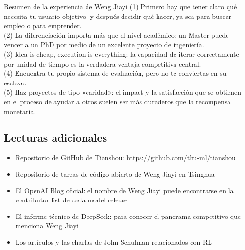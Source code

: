 \begin{importantbox}{Resumen de la experiencia de Weng Jiayi}
(1) Primero hay que tener claro qué necesita tu usuario objetivo, y después decidir qué hacer, ya sea para buscar empleo o para emprender.\\
(2) La diferenciación importa más que el nivel académico: un Master puede vencer a un PhD por medio de un excelente proyecto de ingeniería.\\
(3) Idea is cheap, execution is everything: la capacidad de iterar correctamente por unidad de tiempo es la verdadera ventaja competitiva central.\\
(4) Encuentra tu propio sistema de evaluación, pero no te conviertas en su esclavo.\\
(5) Haz proyectos de tipo «caridad»: el impact y la satisfacción que se obtienen en el proceso de ayudar a otros suelen ser más duraderos que la recompensa monetaria.
\end{importantbox}

\subsection{Lecturas adicionales}

\begin{itemize}
    \item Repositorio de GitHub de Tianshou: \url{https://github.com/thu-ml/tianshou}
    \item Repositorio de tareas de código abierto de Weng Jiayi en Tsinghua
    \item El OpenAI Blog oficial: el nombre de Weng Jiayi puede encontrarse en la contributor list de cada model release
    \item El informe técnico de DeepSeek: para conocer el panorama competitivo que menciona Weng Jiayi
    \item Los artículos y las charlas de John Schulman relacionados con RL
\end{itemize}



